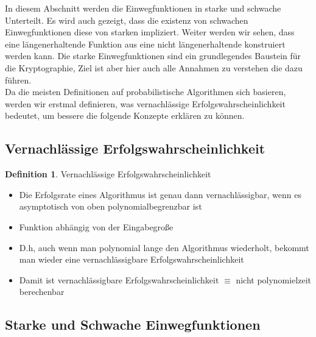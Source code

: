 \documentclass[12pt,a4paper]{article}
\theoremstyle{definition}
\newtheorem{definition}[theorem]{Definition}
\begin{document}
    In diesem Abschnitt werden die Einwegfunktionen in starke und schwache Unterteilt. Es wird auch gezeigt, dass die
    existenz von schwachen Einwegfunktionen diese von starken impliziert. Weiter werden wir sehen, dass eine
    längenerhaltende Funktion aus eine nicht längenerhaltende konstruiert werden kann. Die starke Einwegfunktionen
    sind ein grundlegendes Baustein für die Kryptographie, Ziel ist aber hier auch alle Annahmen zu verstehen die dazu
    führen. \\
    Da die meisten Definitionen auf probabilistische Algorithmen sich basieren, werden wir erstmal definieren, was
    vernachlässige Erfolgswahrscheinlichkeit bedeutet, um bessere die folgende Konzepte erklären zu können.

    \subsection{Vernachlässige Erfolgswahrscheinlichkeit}

    \begin{definition}
        Vernachlässige Erfolgswahrscheinlichkeit
        \begin{itemize}
            \item Die Erfolgsrate eines Algorithmus ist genau dann vernachlässigbar, wenn es asymptotisch von oben
                polynomialbegrenzbar ist
            \item Funktion abhängig von der Eingabegroße
            \item D.h, auch wenn man polynomial lange den Algorithmus wiederholt, bekommt man wieder eine
                vernachlässigbare Erfolgswahrscheinlichkeit
            \item Damit ist vernachlässigbare Erfolgswahrscheinlichkeit $\equiv$ nicht polynomielzeit berechenbar
        \end{itemize}
    \end{definition}

    \subsection{Starke und Schwache Einwegfunktionen}
\end{document}

